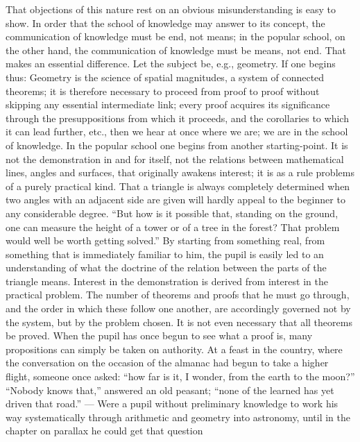\documentclass[12pt,a4paper,openany]{book}
\newcommand{\opage}[1]{\marginnote{\footnotesize\textit{[#1]}}}
\begin{document}
That objections of this nature rest on an obvious
misunderstanding is easy to show. In order that the school of knowledge
may answer to its concept, the communication of knowledge must
be end, not means; in the popular school, on the other hand,
the communication of knowledge must be means, not end. That
makes an essential difference. Let the subject be, e.g., geometry.
If one begins thus: Geometry is
the science of spatial magnitudes, a system of connected
theorems; it is therefore necessary to proceed
from proof to proof without skipping any essential
intermediate link; every proof acquires its significance through
\setcounter{footnote}{0}%
\opage{420}the presuppositions from which it proceeds, and the corollaries
to which it can lead further, etc., then we hear
at once where we are; we are in the school of knowledge. In the popular school
one begins from another starting-point. It is
not the demonstration in and for itself, not the relations between
mathematical lines, angles and surfaces, that originally
awakens interest; it is as a rule problems of a purely
practical kind. That a triangle is always completely determined
when two angles with an adjacent side are
given will hardly appeal to the beginner to any considerable degree.
``But how is it possible that, standing
on the ground, one can measure the height of a tower or of a
tree in the forest? That problem would well be worth getting
solved.'' By starting from something real, from something that
is immediately familiar to him, the pupil is easily led to an
understanding of what the doctrine of the relation between the parts of the triangle
means. Interest in the demonstration is derived
from interest in the practical problem. The number of
theorems and proofs that he must go through, and the
order in which these follow one another, are accordingly governed
not by the system, but by the problem chosen. It
is not even necessary that all theorems be proved.
When the pupil has once begun to see what
a proof is, many propositions can simply be taken on
authority. At a feast in the country, where the conversation on the
occasion of the almanac had begun to take a
higher flight, someone once asked: ``how far
is it, I wonder, from the earth to the moon?'' ``Nobody
knows that,'' answered an old peasant; ``none
of the learned has yet driven that road.'' --- Were
a pupil without preliminary knowledge to work his way systematically
\setcounter{footnote}{0}%
\opage{421}through arithmetic and geometry into astronomy,
until in the chapter on parallax he could get that question
\end{document}
